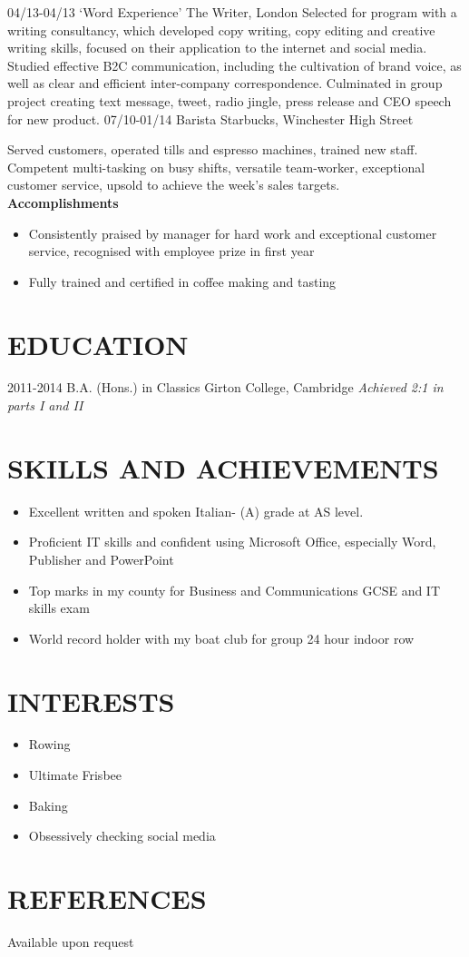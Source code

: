\documentclass[]{friggeri-cv}
\begin{document}
  \begin{entrylist}
  \entry
  {04/13-04/13}
  {‘Word Experience’}
  {The Writer, London}
  {Selected for program with a writing consultancy, which developed copy writing, copy editing and creative writing skills, focused on their application to the internet and social media. Studied effective B2C communication, including the cultivation of brand voice, as well as clear and efficient inter-company correspondence. Culminated in group project creating text message, tweet, radio jingle, press release and CEO speech for new product.}
  \entry
  {07/10-01/14}
  {Barista}
  {Starbucks, Winchester High Street}
  {Served customers, operated tills and espresso machines, trained new staff. Competent multi-tasking on busy shifts, versatile team-worker, exceptional customer service, upsold to achieve the week's sales targets. \\
  	\textbf{Accomplishments}
  	\begin{itemize}
  		\item Consistently praised by manager for hard work and exceptional customer service, recognised with employee prize in first year
  		\item Fully trained and certified in coffee making and tasting
  	\end{itemize}
  }
\end{entrylist}

\section{EDUCATION}

\begin{entrylist}
	\entry
	{2011-2014}
	{B.A. (Hons.) in Classics}
	{Girton College, Cambridge}
	{\emph{Achieved 2:1 in parts I and II}}
\end{entrylist}

\section{SKILLS AND ACHIEVEMENTS}

\begin{itemize}
	\item Excellent written and spoken Italian- (A) grade at AS level. 
	\item Proficient IT skills and confident using Microsoft Office, especially Word, Publisher and PowerPoint
	\item Top marks in my county for Business and Communications GCSE and IT skills exam 
	\item World record holder with my boat club for group 24 hour indoor row
\end{itemize}

\section{INTERESTS}

\begin{itemize}
	\item Rowing
	\item Ultimate Frisbee
	\item Baking
	\item Obsessively checking social media
\end{itemize}

\section{REFERENCES}

Available upon request
\end{document}
